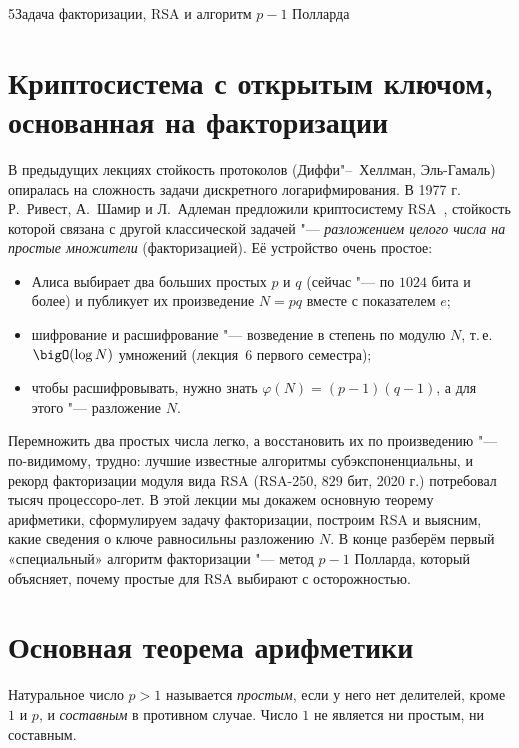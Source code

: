 \begin{lecture}{5}{Задача факторизации, RSA и алгоритм \texorpdfstring{$p - 1$}{p - 1} Полларда}

\section{Криптосистема с открытым ключом, основанная на факторизации}

В предыдущих лекциях стойкость протоколов (Диффи"--~Хеллман, Эль-Гамаль) опиралась на
сложность задачи дискретного логарифмирования. В 1977 г. Р.~Ривест, А.~Шамир и Л.~Адлеман
предложили криптосистему RSA~\cite{rsa}, стойкость которой связана с другой классической
задачей "--- \emph{разложением целого числа на простые множители} (факторизацией). Её
устройство очень простое:
\begin{itemize}
  \item Алиса выбирает два больших простых $p$ и $q$ (сейчас "--- по $1024$ бита и более) и
    публикует их произведение $N = pq$ вместе с показателем $e$;
  \item шифрование и расшифрование "--- возведение в степень по модулю $N$, т.\,е.
    $\bigO(\log N)$ умножений (лекция~6 первого семестра);
  \item чтобы расшифровывать, нужно знать $\varphi(N) = (p - 1)(q - 1)$, а для этого "---
    разложение $N$.
\end{itemize}
Перемножить два простых числа легко, а восстановить их по произведению "--- по-видимому,
трудно: лучшие известные алгоритмы субэкспоненциальны, и рекорд факторизации модуля вида RSA
(RSA-250, $829$ бит, 2020 г.) потребовал тысяч процессоро-лет. В этой лекции мы докажем
основную теорему арифметики, сформулируем задачу факторизации, построим RSA и выясним, какие
сведения о ключе равносильны разложению $N$. В конце разберём первый «специальный» алгоритм
факторизации "--- метод $p - 1$ Полларда, который объясняет, почему простые для RSA
выбирают с осторожностью.

\section{Основная теорема арифметики}

Натуральное число $p > 1$ называется \emph{простым}, если у него нет делителей, кроме $1$ и
$p$, и \emph{составным} в противном случае. Число $1$ не является ни простым, ни составным.


\end{lecture}
